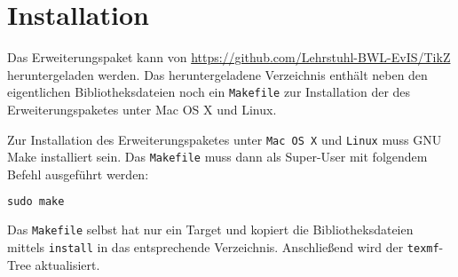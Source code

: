 \documentclass[12pt, a4paper]{article}
\begin{document}
\section{Installation}
\label{sec:Installation}
Das Erweiterungspaket kann von \url{https://github.com/Lehrstuhl-BWL-EvIS/TikZ} heruntergeladen werden. Das heruntergeladene Verzeichnis enthält neben den eigentlichen Bibliotheksdateien noch ein \texttt{Makefile} zur Installation der des Erweiterungspaketes unter \textsf{Mac OS X} und \textsf{Linux}.\medskip

\noindent Zur Installation des Erweiterungspaketes unter \texttt{Mac OS X} und \texttt{Linux} muss \textsf{GNU Make} installiert sein.
Das \texttt{Makefile} muss dann als Super-User mit folgendem Befehl ausgeführt werden:
\begin{lstlisting}[language=C]
    sudo make
\end{lstlisting}
Das \texttt{Makefile} selbst hat nur ein Target und kopiert die Bibliotheksdateien mittels \texttt{install} in das entsprechende Verzeichnis. Anschließend wird der \texttt{texmf}-Tree aktualisiert.
\end{document}
